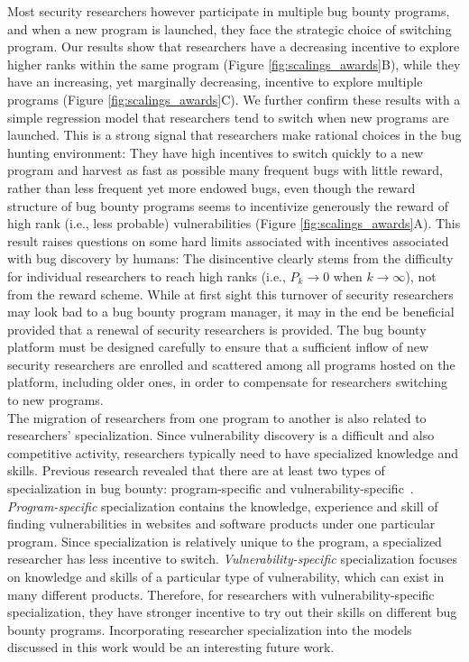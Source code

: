 Most security researchers however participate in multiple bug bounty programs, and when a new program is launched, they face the strategic choice of switching program. Our results show that researchers have a decreasing incentive to explore higher ranks within the same program (Figure \ref{fig:scalings_awards}B), while they have an increasing, yet marginally decreasing, incentive to explore multiple programs (Figure \ref{fig:scalings_awards}C). We further confirm these results with a simple regression model that researchers tend to switch when new programs are launched. This is a strong signal that researchers make rational choices in the bug hunting environment: They have high incentives to switch quickly to a new program and harvest as fast as possible many frequent bugs with little reward, rather than less frequent yet more endowed bugs, even though the reward structure of bug bounty programs seems to incentivize generously the reward of high rank (i.e., less probable) vulnerabilities (Figure \ref{fig:scalings_awards}A). This result raises questions on some hard limits associated with incentives associated with bug discovery by humans: The disincentive clearly stems from the difficulty for individual researchers to reach high ranks (i.e., $P_{k} \rightarrow 0$ when $k \rightarrow \infty$), not from the reward scheme. While at first sight this turnover of security researchers may look bad to a bug bounty program manager, it may in the end be beneficial provided that a renewal of security researchers is provided. The bug bounty platform must be designed carefully to ensure that a sufficient inflow of new security researchers are enrolled and scattered among all programs hosted on the platform, including older ones, in order to compensate for researchers switching to new programs.\\

The migration of researchers from one program to another is also related to researchers' specialization. Since vulnerability discovery is a difficult and also competitive activity, researchers typically need to have specialized knowledge and skills. Previous research revealed that there are at least two types of specialization in bug bounty: program-specific and vulnerability-specific~\cite{zhao2014exploratory,zhao2015empirical}. \textit{Program-specific} specialization contains the knowledge, experience and skill of finding vulnerabilities in websites and software products under one particular program. Since specialization is relatively unique to the program, a specialized researcher has less incentive to switch. \textit{Vulnerability-specific} specialization focuses on knowledge and skills of a particular type of vulnerability, which can exist in many different products. Therefore, for researchers with vulnerability-specific specialization, they have stronger incentive to try out their skills on different bug bounty programs. Incorporating researcher specialization into the models discussed in this work would be an interesting future work. \\

